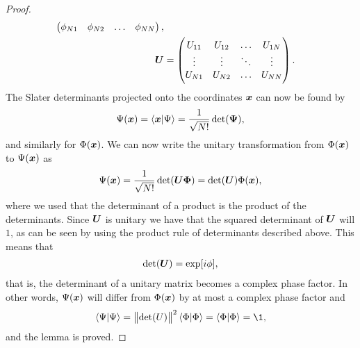 \begin{proof}
\begin{align}
\begin{pmatrix}
                    \phi_{N1} & \phi_{N2} & \dots & \phi_{NN}
                \end{pmatrix}, \\
                \boldsymbol{U}
                &= \begin{pmatrix}
                    U_{11} & U_{12} & \dots & U_{1N} \\
                    \vdots & \vdots & \ddots & \vdots \\
                    U_{N1} & U_{N2} & \dots & U_{NN}
                \end{pmatrix}.
            \end{align}
            The Slater determinants projected onto the coordinates $\boldsymbol{x}$
            can now be found by
            \begin{align}
                \Psi(\boldsymbol{x})
                = \braket{\boldsymbol{x}}{\Psi}
                = \frac{1}{\sqrt{N!}}\det(\boldsymbol{\Psi}),
            \end{align}
            and similarly for $\Phi(\boldsymbol{x})$.
            We can now write the unitary transformation from $\Phi(\boldsymbol{x})$
            to $\Psi(\boldsymbol{x})$ as
            \begin{align}
                \Psi(\boldsymbol{x})
                = \frac{1}{\sqrt{N!}}
                \det(\boldsymbol{U}\boldsymbol{\Phi})
                = \det(\boldsymbol{U})\Phi(\boldsymbol{x}),
            \end{align}
            where we used that the determinant of a product is the product
            of the determinants.
            Since $\boldsymbol{U}$ is unitary we have that the squared determinant
            of $\boldsymbol{U}$ will $1$, as can be seen by using the product rule
            of determinants described above.
            This means that
            \begin{align}
                \det(\boldsymbol{U}) = \exp[i\phi],
            \end{align}
            that is, the determinant of a unitary matrix becomes a complex
            phase factor.
            In other words, $\Psi(\boldsymbol{x})$ will differ from $\Phi(\boldsymbol{x})$
            by at most a complex phase factor and
            \begin{align}
                \braket{\Psi}
                = \norm{\det(U)}^2\braket{\Phi}
                = \braket{\Phi}
                = \1,
            \end{align}
            and the lemma is proved.
        \end{proof}


